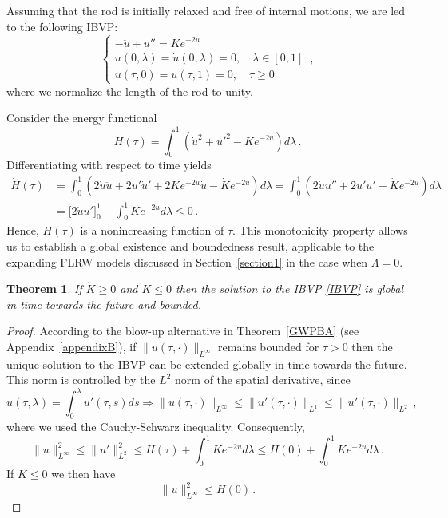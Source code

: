 \documentclass[10pt]{amsart}
\newtheorem{Thm}{Theorem}[section]
\begin{document}
Assuming that the rod is initially relaxed and free of internal motions, we are led to the following IBVP:
\begin{equation} \label{IBVP}
\begin{cases}
- \ddot{u} + u'' = K e^{- 2u} \\
u(0,\lambda)=\dot{u}(0,\lambda)=0, \quad \lambda \in [0,1] \\
u(\tau,0) = u(\tau,1) = 0, \quad \tau\geq 0
\end{cases} \, ,
\end{equation}
where we normalize the length of the rod to unity.

Consider the energy functional
\begin{equation}
H(\tau) = \int_0^1 \left( \dot{u}^2 + u'^2 - K e^{-2u} \right) d\lambda \, .
\end{equation}
Differentiating with respect to time yields
\begin{align}
\dot{H}(\tau) & = \int_0^1 \left( 2\dot{u}\ddot{u} + 2u'\dot{u}' + 2K e^{-2u}\dot{u} - \dot{K} e^{-2u} \right) d\lambda = \int_0^1 \left( 2\dot{u}u'' + 2u'\dot{u}' - \dot{K} e^{-2u} \right) d\lambda \nonumber \\
& = \Big[ 2\dot{u}u' \Big]_0^1 - \int_0^1 \dot{K} e^{-2u}d\lambda \leq 0 \, . \label{energycalculation}
\end{align}
Hence, $H(\tau)$ is a nonincreasing function of $\tau$. This monotonicity property allows us to establish a global existence and boundedness result, applicable to the expanding FLRW models discussed in Section~\ref{section1} in the case when $\Lambda = 0$.

\begin{Thm}
If $\dot{K} \geq 0$ and $K \leq 0$ then the solution to the IBVP \eqref{IBVP} is global in time towards the future and bounded.
\end{Thm}

\begin{proof}
According to the blow-up alternative in Theorem~\ref{GWPBA} (see Appendix~\ref{appendixB}), if $\|u(\tau,\cdot)\|_{L^\infty}$ remains bounded for $\tau>0$ then the unique solution to the IBVP can be extended globally in time towards the future. This norm is controlled by the $L^2$ norm of the spatial derivative, since
\begin{equation}
u(\tau,\lambda) = \int_0^\lambda u'(\tau,s) ds \Rightarrow \|u(\tau,\cdot)\|_{L^\infty} \leq \|u'(\tau,\cdot)\|_{L^1} \leq \|u'(\tau,\cdot)\|_{L^2} \, ,
\end{equation}
where we used the Cauchy-Schwarz inequality. Consequently,
\begin{equation} \label{Linftybound}
\|u\|^2_{L^\infty} \leq \|u'\|^2_{L^2} \leq H(\tau) + \int_0^1 K e^{-2u} d\lambda \leq H(0) + \int_0^1 K e^{-2u} d\lambda \, .
\end{equation}
If $K \leq 0$ we then have
\begin{equation}
\|u\|^2_{L^\infty} \leq H(0) \, .
\end{equation}
\end{proof}
\end{document}

